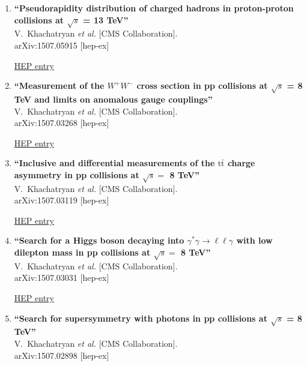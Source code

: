 \documentclass{article}
\begin{document}
\begin{enumerate}
\item%
{\bf ``Pseudorapidity distribution of charged hadrons in proton-proton collisions at $\sqrt{s}$ = 13 TeV''}
  \\{}V.~Khachatryan {\it et al.} [CMS Collaboration].
  \\{}arXiv:1507.05915 [hep-ex]
  
\href{http://inspirehep.net/record/1384119}{HEP entry}



\item%
{\bf ``Measurement of the $W^+W^-$ cross section in pp collisions at $\sqrt{s}$ = 8 TeV and limits on anomalous gauge couplings''}
  \\{}V.~Khachatryan {\it et al.} [CMS Collaboration].
  \\{}arXiv:1507.03268 [hep-ex]
  
\href{http://inspirehep.net/record/1382594}{HEP entry}


\item%
{\bf ``Inclusive and differential measurements of the $\mathrm{ t \bar{t} }$ charge asymmetry in pp collisions at $\sqrt{s} =$ 8 TeV''}
  \\{}V.~Khachatryan {\it et al.} [CMS Collaboration].
  \\{}arXiv:1507.03119 [hep-ex]
  
\href{http://inspirehep.net/record/1382590}{HEP entry}


\item%
{\bf ``Search for a Higgs boson decaying into $\gamma^*\gamma\to\ell\ell\gamma$ with low dilepton mass in pp collisions at $\sqrt{s} =$ 8 TeV''}
  \\{}V.~Khachatryan {\it et al.} [CMS Collaboration].
  \\{}arXiv:1507.03031 [hep-ex]
  
\href{http://inspirehep.net/record/1382587}{HEP entry}



\item%
{\bf ``Search for supersymmetry with photons in pp collisions at $\sqrt{s}$ = 8 TeV''}
  \\{}V.~Khachatryan {\it et al.} [CMS Collaboration].
  \\{}arXiv:1507.02898 [hep-ex]
  

\end{enumerate}
\end{document}
